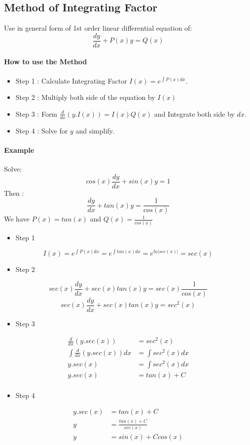 \subsection{Method of Integrating Factor}
\begin{tcolorbox}[title=Method]
	Use in general form of 1st order linear differential equation of:
	\[\frac{dy}{dx} + P(x)y = Q(x)\]
	\paragraph{How to use the Method}
	\begin{itemize}
		\item Step 1 : Calculate Integrating Factor $ I(x) = e^{\int P(x)dx}$.
		\item Step 2 : Multiply both side of the equation by $ I(x) $
		\item Step 3 : Form $ \frac{d}{dx} (y.I(x)) = I(x)Q(x)$ and Integrate both side by $ dx $.
		\item Step 4 : Solve for $ y $ and simplify.
	\end{itemize}
\end{tcolorbox}

\paragraph{Example} Solve:
\[
cos(x)\frac{dy}{dx} + sin(x)y= 1
\]
Then :
\[
\frac{dy}{dx} + tan(x)y= \frac{1}{cos(x)}
\]
We have $ P(x) = tan(x)$ and $ Q(x) = \frac{1}{cos(x)} $
\begin{itemize}
	\item Step 1
\end{itemize}
\[
I(x) = e^{\int P(x)dx} = e^{\int tan(x)dx} = e^{ln|sec(x)|} = sec(x)
\]
\begin{itemize}
	\item Step 2
\end{itemize}
\[
sec(x)\frac{dy}{dx} + sec(x)tan(x)y= sec(x)\frac{1}{cos(x)}
\]
\[
sec(x)\frac{dy}{dx} + sec(x)tan(x)y= sec^2(x)
\]
\begin{itemize}
	\item Step 3
\end{itemize}
\[
\begin{split}
	\frac{d}{dx}(y.sec(x)) &= sec^2(x) \\
	\int \frac{d}{dx}(y.sec(x))dx &= \int sec^2(x) dx\\
	y.sec(x) &= \int sec^2(x) dx\\
	y.sec(x) &= tan(x) + C\\
\end{split}
\]
\begin{itemize}
	\item Step 4
\end{itemize}
\[
\begin{split}
	y.sec(x) &= tan(x) + C\\
	y &= \frac{tan(x) + C}{sec(x)} \\
	y &= sin(x) + Ccos(x)
\end{split}
\]